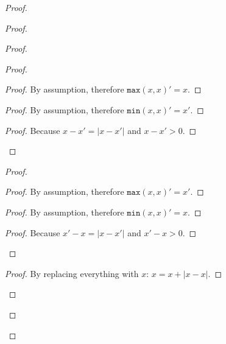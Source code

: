 \documentclass[9pt, oneside]{article}   	%
\begin{document}
\begin{proof}

	\begin{proof}
		\begin{proof}
			\begin{proof}
				\begin{proof}
					By assumption, therefore $\texttt{max}(x,x)' = x$.
				\end{proof}
				
				\begin{proof}
					By assumption, therefore $\texttt{min}(x,x)' = x'$.
				\end{proof}
				
				\qedstep
				\begin{proof}
					Because $x - x' = | x - x' |$ and $x - x' > 0$.
				\end{proof}
			\end{proof}
			
			\begin{proof}
				\begin{proof}
					By assumption, therefore $\texttt{max}(x,x)' = x'$.
				\end{proof}
				
				\begin{proof}
					By assumption, therefore $\texttt{min}(x,x)' = x$.
				\end{proof}
				
				\qedstep
				\begin{proof}
					Because $x'-x = | x - x' |$ and $x' - x > 0$.
				\end{proof}
			\end{proof}
			
			\begin{proof}
				By replacing everything with $x$: $x = x + | x - x |$.
			\end{proof}
			

\end{proof}
\end{proof}
\end{proof}
\end{document}
